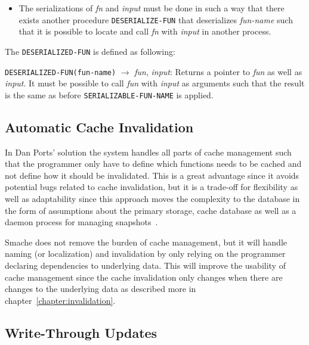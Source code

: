\begin{itemize}
  \item The serializations of \emph{fn} and \emph{input} must be done in such a way that there exists another procedure \verb$DESERIALIZE-FUN$ that deserializes \emph{fun-name} such that it is possible to locate and call \emph{fn} with \emph{input} in another process.
\end{itemize}

The \verb$DESERIALIZED-FUN$ is defined as following:

\verb$DESERIALIZED-FUN(fun-name)$ $\rightarrow$ \emph{fun}, \emph{input}: Returns a pointer to \emph{fun} as well as \emph{input}. It must be possible to call \emph{fun} with \emph{input} as arguments such that the result is the same as before \verb$SERIALIZABLE-FUN-NAME$ is applied.


\subsection{Automatic Cache Invalidation}
\label{subsec:automatic_cache_invalidation}

In Dan Ports' solution the system handles all parts of cache management such that the programmer only have to define which functions needs to be cached and not define how it should be invalidated. This is a great advantage since it avoids potential bugs related to cache invalidation, but it is a trade-off for flexibility as well as adaptability since this approach moves the complexity to the database in the form of assumptions about the primary storage, cache database as well as a daemon process for managing snapshots~\cite{paper:liskov}.

Smache does not remove the burden of cache management, but it will handle naming (or localization) and invalidation by only relying on the programmer declaring dependencies to underlying data. This will improve the usability of cache management since the cache invalidation only changes when there are changes to the underlying data as described more in chapter~\ref{chapter:invalidation}.


\subsection{Write-Through Updates}
\label{subsec:write-through-updates}

